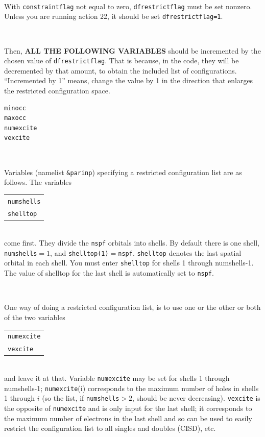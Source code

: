 \documentclass[10pt,leqno, oneside]{book}
\begin{document}
\

With \verb#constraintflag# not equal to zero, \verb#dfrestrictflag# must be set nonzero.  Unless you are running action 22, it should be set \verb#dfrestrictflag=1#.

\

Then, \textbf{ALL THE FOLLOWING VARIABLES} 
should be incremented by the chosen value of \verb#dfrestrictflag#.  That is because, in the code, they
will be decremented by that amount, to obtain the included list of configurations.
 ``Incremented by 1'' means, change the value by 1 in the direction that enlarges the restricted configuration
space.  

\begin{verbatim}
minocc
maxocc
numexcite
vexcite
\end{verbatim}

\

Variables (namelist \verb#&parinp#) specifying a restricted configuration list are as follows.
The variables \\
\begin{tabular}{l}
\qquad \verb#numshells#\\
\qquad \verb#shelltop# \\
\end{tabular} \\
come first.  They divide the \verb#nspf# orbitals into shells.  By default there is one shell, \verb#numshells#$=1$, 
and \verb#shelltop(1)#$=$\verb#nspf#.
 \verb#shelltop# denotes the last spatial orbital in each shell.  You must enter \verb#shelltop# for shells 1 through numshells-1.  The value of shelltop for the last shell is automatically set to \verb#nspf#.  
 
 \
 
One way of doing a restricted configuration list, is to use one or the other or both of the two variables
\begin{tabular}{l}
\qquad \verb#numexcite# \\
\qquad \verb#vexcite#  \\
\end{tabular} \\
and leave it at that. 
Variable \verb#numexcite# may be set for shells 1 through numshells-1; \verb#numexcite#(i) corresponds to the maximum number of holes in shells 
1 through $i$ (so the list, if \verb#numshells#$>2$, should be never decreasing).  
\verb#vexcite# is the opposite of \verb#numexcite# and is only input for the last shell; it
corresponds to the maximum number of electrons in the last shell and so can be used 
to easily restrict the configuration list to all singles and doubles (CISD), etc.  
\end{document}
